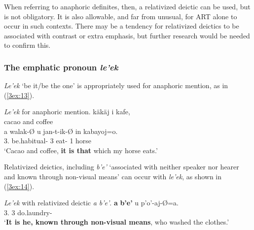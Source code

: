 \documentclass[output=paper]{langsci/langscibook}
\begin{document}
When referring to anaphoric definites, then, a relativized deictic can be used, but is not obligatory. It is also allowable, and far from unusual, for ART alone to occur in such contexts.  There may be a tendency for relativized deictics to be associated with contrast or extra emphasis, but further research would be needed to confirm this.

\filbreak
\subsubsection{The emphatic pronoun {\emph{le'ek}} }\label{3sec:313}
{\emph{Le'ek}} `be it/be the one' is appropriately used for anaphoric mention, as in (\ref{3ex:13}).

\begin{samepage}
\begin{exe}
\ex\label{3ex:13}
{\emph{Le'ek}} for anaphoric mention. 
\exi{}
\gll 	k\"ak\"aj 	i	kafe, 	 \\
	cacao	and	coffee	 \\
\glt
\exi{}
	 	a 	walak-{\O}	 		u 		jan-t-ik-{\O}			in 		kabayoj=o. \\
	3.{}	{}	be.habitual-{} 	3{}	eat-{}	1{}	horse{} \\
\glt 	`Cacao and coffee, {\bf{it is that}} which my horse eats.'
\end{exe}
\end{samepage}

{
Relativized deictics, including {\emph{b'e'}} `associated with neither speaker nor hearer and known through non-visual means' can occur with {\emph{le'ek}}, as shown in (\ref{3ex:14}).
}

\begin{exe}
\ex\label{3ex:14}
{\emph{Le'ek}} with relativized deictic {\emph{a b'e'}}. 
\exi{}
 	{\bf{a}} 	{\bf{b'e'}}		u 		p'o'-aj-\O=a. \\
	3.{}	{}	{}	3{}	do.laundry-{} \\
\glt	`{\bf{It is he, known through non-visual means}}, who washed the clothes.'
\end{exe}
\end{document}
